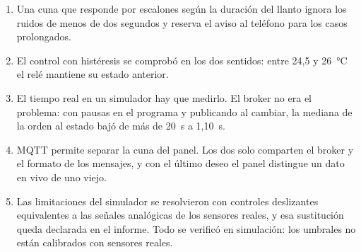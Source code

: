 \begin{enumerate}[label=\arabic*.]
  \item Una cuna que responde por escalones según la duración del llanto ignora los ruidos
        de menos de dos segundos y reserva el aviso al teléfono para los casos prolongados.
  \item El control con histéresis se comprobó en los dos sentidos: entre 24,5 y 26~°C el
        relé mantiene su estado anterior.
  \item El tiempo real en un simulador hay que medirlo. El broker no era el problema: con
        pausas en el programa y publicando al cambiar, la mediana de la orden al estado bajó
        de más de 20~s a 1,10~s.
  \item MQTT permite separar la cuna del panel. Los dos solo comparten el broker y el
        formato de los mensajes, y con el último deseo el panel distingue un dato en vivo de
        uno viejo.
  \item Las limitaciones del simulador se resolvieron con controles deslizantes
        equivalentes a las señales analógicas de los sensores reales, y esa
        sustitución queda declarada en el informe. Todo se verificó en simulación: los
        umbrales no están calibrados con sensores reales.
\end{enumerate}

